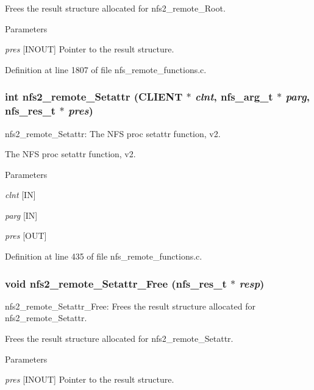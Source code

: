 Frees the result structure allocated for nfs2\_\-remote\_\-Root.


\begin{DoxyParams}{Parameters}
\item[{\em pres}][INOUT] Pointer to the result structure. \end{DoxyParams}


Definition at line 1807 of file nfs\_\-remote\_\-functions.c.
\subsubsection[{nfs2\_\-remote\_\-Setattr}]{\setlength{\rightskip}{0pt plus 5cm}int nfs2\_\-remote\_\-Setattr (CLIENT $\ast$ {\em clnt}, \/  nfs\_\-arg\_\-t $\ast$ {\em parg}, \/  nfs\_\-res\_\-t $\ast$ {\em pres})}\label{group__NFSprocs_ga68646f70e50ecab0c5d4ff54476b1e8b}
nfs2\_\-remote\_\-Setattr: The NFS proc setattr function, v2.

The NFS proc setattr function, v2.


\begin{DoxyParams}{Parameters}
\item[{\em clnt}][IN] \item[{\em parg}][IN] \item[{\em pres}][OUT] \end{DoxyParams}


Definition at line 435 of file nfs\_\-remote\_\-functions.c.
\subsubsection[{nfs2\_\-remote\_\-Setattr\_\-Free}]{\setlength{\rightskip}{0pt plus 5cm}void nfs2\_\-remote\_\-Setattr\_\-Free (nfs\_\-res\_\-t $\ast$ {\em resp})}\label{group__NFSprocs_ga0e20b7aa830b3be41bb0c801b2b3b963}
nfs2\_\-remote\_\-Setattr\_\-Free: Frees the result structure allocated for nfs2\_\-remote\_\-Setattr.

Frees the result structure allocated for nfs2\_\-remote\_\-Setattr.


\begin{DoxyParams}{Parameters}
\item[{\em pres}][INOUT] Pointer to the result structure. \end{DoxyParams}


